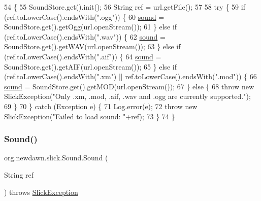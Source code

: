 \begin{DoxyCode}
54                                                 \{
55         SoundStore.get().init();
56         String ref = url.getFile();
57         
58         \textcolor{keywordflow}{try} \{
59             \textcolor{keywordflow}{if} (ref.toLowerCase().endsWith(\textcolor{stringliteral}{".ogg"})) \{
60                 \mbox{\hyperlink{classorg_1_1newdawn_1_1slick_1_1_sound_aefd4460784b86c7003356f59cafe3dc8}{sound}} = SoundStore.get().getOgg(url.openStream());
61             \} \textcolor{keywordflow}{else} \textcolor{keywordflow}{if} (ref.toLowerCase().endsWith(\textcolor{stringliteral}{".wav"})) \{
62                 \mbox{\hyperlink{classorg_1_1newdawn_1_1slick_1_1_sound_aefd4460784b86c7003356f59cafe3dc8}{sound}} = SoundStore.get().getWAV(url.openStream());
63             \} \textcolor{keywordflow}{else} \textcolor{keywordflow}{if} (ref.toLowerCase().endsWith(\textcolor{stringliteral}{".aif"})) \{
64                 \mbox{\hyperlink{classorg_1_1newdawn_1_1slick_1_1_sound_aefd4460784b86c7003356f59cafe3dc8}{sound}} = SoundStore.get().getAIF(url.openStream());
65             \} \textcolor{keywordflow}{else} \textcolor{keywordflow}{if} (ref.toLowerCase().endsWith(\textcolor{stringliteral}{".xm"}) || ref.toLowerCase().endsWith(\textcolor{stringliteral}{".mod"})) \{
66                 \mbox{\hyperlink{classorg_1_1newdawn_1_1slick_1_1_sound_aefd4460784b86c7003356f59cafe3dc8}{sound}} = SoundStore.get().getMOD(url.openStream());
67             \} \textcolor{keywordflow}{else} \{
68                 \textcolor{keywordflow}{throw} \textcolor{keyword}{new} SlickException(\textcolor{stringliteral}{"Only .xm, .mod, .aif, .wav and .ogg are currently supported."});
69             \}
70         \} \textcolor{keywordflow}{catch} (Exception e) \{
71             Log.error(e);
72             \textcolor{keywordflow}{throw} \textcolor{keyword}{new} SlickException(\textcolor{stringliteral}{"Failed to load sound: "}+ref);
73         \}
74     \}
\end{DoxyCode}
\mbox{\label{classorg_1_1newdawn_1_1slick_1_1_sound_af6e8f8212cedf93b2ca0006bf453e39c}} 
\subsubsection{\texorpdfstring{Sound()}{Sound()}\hspace{0.1cm}{\footnotesize\ttfamily [3/3]}}
{\footnotesize\ttfamily org.\+newdawn.\+slick.\+Sound.\+Sound (\begin{DoxyParamCaption}\item[{String}]{ref }\end{DoxyParamCaption}) throws \mbox{\hyperlink{classorg_1_1newdawn_1_1slick_1_1_slick_exception}{Slick\+Exception}}\hspace{0.3cm}{\ttfamily [inline]}}

